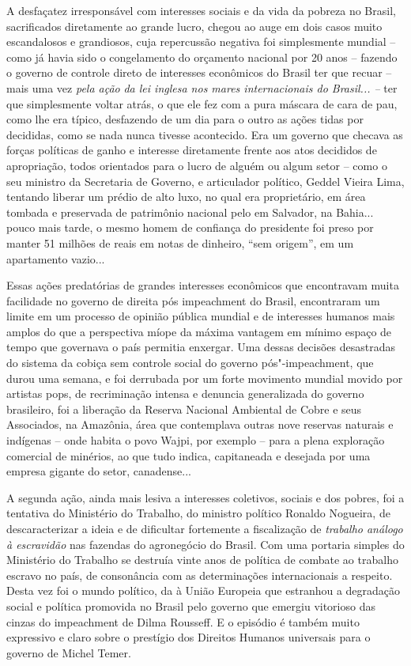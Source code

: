 A desfaçatez irresponsável com interesses sociais e da vida da pobreza
no Brasil, sacrificados diretamente ao grande lucro, chegou ao auge em
dois casos muito escandalosos e grandiosos, cuja repercussão negativa
foi simplesmente mundial -- como já havia sido o congelamento do
orçamento nacional por 20 anos -- fazendo o governo de controle direto
de interesses econômicos do Brasil ter que recuar -- mais uma vez
\emph{pela ação} \emph{da lei inglesa nos mares internacionais do
Brasil... --} ter que simplesmente voltar atrás, o que ele fez com a
pura máscara de cara de pau, como lhe era típico, desfazendo de um dia
para o outro as ações tidas por decididas, como se nada nunca tivesse
acontecido. Era um governo que checava as forças políticas de ganho e
interesse diretamente frente aos atos decididos de apropriação, todos
orientados para o lucro de alguém ou algum setor -- como o seu ministro
da Secretaria de Governo, e articulador político, Geddel Vieira Lima,
tentando liberar um prédio de alto luxo, no qual era proprietário, em
área tombada e preservada de patrimônio nacional pelo  em Salvador,
na Bahia... pouco mais tarde, o mesmo homem de confiança do presidente
foi preso por manter 51 milhões de reais em notas de dinheiro, ``sem
origem'', em um apartamento vazio...

Essas ações predatórias de grandes interesses econômicos que encontravam
muita facilidade no governo de direita pós impeachment do Brasil,
encontraram um limite em um processo de opinião pública mundial e de
interesses humanos mais amplos do que a perspectiva míope da máxima
vantagem em mínimo espaço de tempo que governava o país permitia
enxergar. Uma dessas decisões desastradas do sistema da cobiça sem
controle social do governo pós"-impeachment, que durou uma semana, e foi
derrubada por um forte movimento mundial movido por artistas pops, de
recriminação intensa e denuncia generalizada do governo brasileiro, foi
a liberação da Reserva Nacional Ambiental de Cobre e seus Associados, na
Amazônia, área que contemplava outras nove reservas naturais e indígenas
-- onde habita o povo Wajpi, por exemplo -- para a plena exploração
comercial de minérios, ao que tudo indica, capitaneada e desejada por
uma empresa gigante do setor, canadense...

A segunda ação, ainda mais lesiva a interesses coletivos, sociais e dos
pobres, foi a tentativa do Ministério do Trabalho, do ministro político
Ronaldo Nogueira, de descaracterizar a ideia e de dificultar fortemente
a fiscalização de \emph{trabalho análogo à escravidão} nas fazendas do
agronegócio do Brasil. Com uma portaria simples do Ministério do
Trabalho se destruía vinte anos de política de combate ao trabalho
escravo no país, de consonância com as determinações internacionais a
respeito. Desta vez foi o mundo político, da  à União Europeia que
estranhou a degradação social e política promovida no Brasil pelo
governo que emergiu vitorioso das cinzas do impeachment de Dilma
Rousseff. E o episódio é também muito expressivo e claro sobre o
prestígio dos Direitos Humanos universais para o governo de Michel
Temer.

